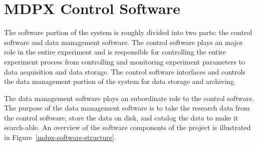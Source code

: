 

\section{MDPX Control Software}\label{section-control-system}

The software portion of the system is roughly divided into two parts: the control software and data management software. The control software plays an major role in the entire experiment and is responsible for controlling the entire experiment process from controlling and monitoring experiment parameters to data acquisition and data storage. The control software interfaces and controls the data management portion of the system for data storage and archiving.

The data management software plays an subordinate role to the control software. The purpose of the data management software is to take the research data from the control software, store the data on disk, and catalog the data to make it search-able. An overview of the software components of the project is illustrated in Figure~\ref{mdpx-software-structure}.


